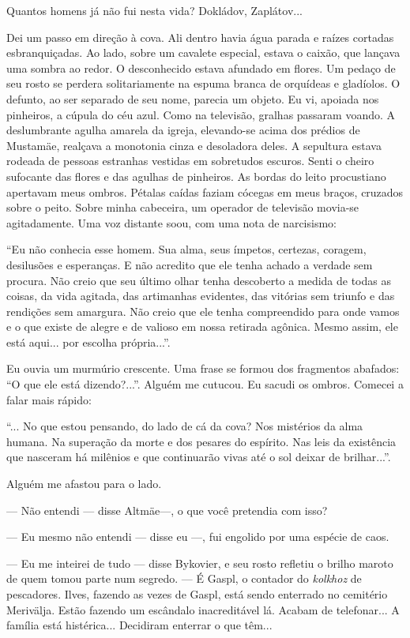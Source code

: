 Quantos homens já não fui nesta vida? Dokládov, Zaplátov...

Dei um passo em direção à cova. Ali dentro havia água parada e raízes
cortadas esbranquiçadas. Ao lado, sobre um cavalete especial, estava o
caixão, que lançava uma sombra ao redor. O desconhecido estava afundado
em flores. Um pedaço de seu rosto se perdera solitariamente na espuma
branca de orquídeas e gladíolos. O defunto, ao ser separado de seu nome,
parecia um objeto. Eu vi, apoiada nos pinheiros, a cúpula do céu azul.
Como na televisão, gralhas passaram voando. A deslumbrante agulha
amarela da igreja, elevando-se acima dos prédios de Mustamäe, realçava a
monotonia cinza e desoladora deles. A sepultura estava rodeada de
pessoas estranhas vestidas em sobretudos escuros. Senti o cheiro
sufocante das flores e das agulhas de pinheiros. As bordas do leito
procustiano apertavam meus ombros. Pétalas caídas faziam cócegas em meus
braços, cruzados sobre o peito. Sobre minha cabeceira, um operador de
televisão movia-se agitadamente. Uma voz distante soou, com uma nota de
narcisismo:

``Eu não conhecia esse homem. Sua alma, seus ímpetos, certezas, coragem,
desilusões e esperanças. E não acredito que ele tenha achado a verdade
sem procura. Não creio que seu último olhar tenha descoberto a medida de
todas as coisas, da vida agitada, das artimanhas evidentes, das vitórias
sem triunfo e das rendições sem amargura. Não creio que ele tenha
compreendido para onde vamos e o que existe de alegre e de valioso em
nossa retirada agônica. Mesmo assim, ele está aqui... por escolha
própria...''.

Eu ouvia um murmúrio crescente. Uma frase se formou dos fragmentos
abafados: ``O que ele está dizendo?...''. Alguém me cutucou. Eu sacudi
os ombros. Comecei a falar mais rápido:

``... No que estou pensando, do lado de cá da cova? Nos mistérios da
alma humana. Na superação da morte e dos pesares do espírito. Nas leis
da existência que nasceram há milênios e que continuarão vivas até o sol
deixar de brilhar...''.

Alguém me afastou para o lado.

--- Não entendi --- disse Altmäe---, o que você pretendia com isso?

--- Eu mesmo não entendi --- disse eu ---, fui engolido por uma espécie
de caos.

--- Eu me inteirei de tudo --- disse Bykovier, e seu rosto refletiu o
brilho maroto de quem tomou parte num segredo. --- É Gaspl, o contador
do \emph{kolkhoz} de pescadores. Ilves, fazendo as vezes de Gaspl, está
sendo enterrado no cemitério Merivälja. Estão fazendo um escândalo
inacreditável lá. Acabam de telefonar... A família está histérica...
Decidiram enterrar o que têm...

